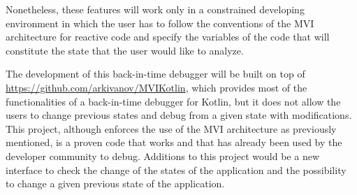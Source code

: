 Nonetheless, these features will work only in a constrained developing environment in which the user has to follow the conventions of the MVI architecture for reactive code and specify the variables of the code that will constitute the state that the user would like to analyze.

The development of this back-in-time debugger will be built on top of \url{https://github.com/arkivanov/MVIKotlin}, which provides most of the functionalities of a back-in-time debugger for Kotlin, but it does not allow the users to change previous states and debug from a given state with modifications. This project, although enforces the use of the MVI architecture as previously mentioned, is a proven code that works and that has already been used by the developer community to debug. Additions to this project would be a new interface to check the change of the states of the application and the possibility to change a given previous state of the application.

\endinput

